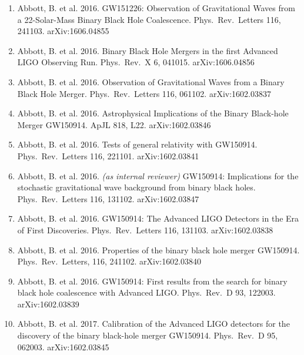 \documentclass[margin,line]{res}
\begin{document}
\begin{resume}
\begin{enumerate}
\vspace{0.2in}
{\bf \large Publications with the LIGO Scientific Collaboration (LSC) [member 2005--2016]:}


\item Abbott, B. et al. 2016.  GW151226: Observation of Gravitational Waves from a 22-Solar-Mass Binary Black Hole Coalescence.  Phys.~Rev.~Letters 116, 241103.  	arXiv:1606.04855

\item Abbott, B. et al. 2016.  Binary Black Hole Mergers in the first Advanced LIGO Observing Run.  Phys.~Rev.~X 6, 041015.  	arXiv:1606.04856

\item Abbott, B. et al. 2016.  Observation of Gravitational Waves from a Binary Black Hole Merger.  Phys.~Rev.~Letters 116, 061102.  arXiv:1602.03837

\item Abbott, B. et al. 2016.  Astrophysical Implications of the Binary Black-hole Merger GW150914.  ApJL 818, L22. arXiv:1602.03846

\item Abbott, B. et al. 2016. Tests of general relativity with GW150914. Phys.~Rev.~Letters 116, 221101. arXiv:1602.03841

\item Abbott, B. et al. 2016.  {\it (as internal reviewer)}   GW150914: Implications for the stochastic gravitational wave background from binary black holes.  Phys.~Rev.~Letters 116, 131102.  arXiv:1602.03847

\item Abbott, B. et al. 2016. GW150914: The Advanced LIGO Detectors in the Era of First Discoveries.   Phys.~Rev.~Letters 116, 131103.  arXiv:1602.03838

\item Abbott, B. et al. 2016. Properties of the binary black hole merger GW150914.   Phys.~Rev.~Letters, 116, 241102.  arXiv:1602.03840

\item Abbott, B. et al. 2016. GW150914: First results from the search for binary black hole coalescence with Advanced LIGO.  Phys.~Rev.~D 93, 122003.  arXiv:1602.03839

\item Abbott, B. et al. 2017. Calibration of the Advanced LIGO detectors for the discovery of the binary black-hole merger GW150914.   Phys.~Rev.~D 95, 062003.  arXiv:1602.03845


\end{enumerate}
\end{resume}
\end{document}
